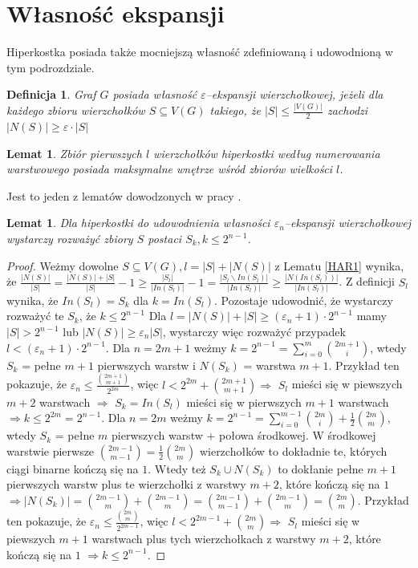 \documentclass{pracamgr}
\newtheorem{defi}{Definicja}[section] %
\newtheorem{lemma}[theorem]{Lemat}
\begin{document}
  \section{Własność ekspansji}
   Hiperkostka posiada także mocniejszą własność zdefiniowaną i udowodnioną w tym podrozdziale.
   \begin{defi}\label{epsilon ekspansja wierzcholkowa}
    Graf $G$ posiada własność \emph{$\varepsilon$--ekspansji wierzchołkowej}, jeżeli dla każdego zbioru wierzchołków $S\subseteq V(G)$ takiego,
    że $|S|\le\frac{|V(G)|}{2}$ zachodzi $|N(S)|\ge\varepsilon\cdot|S|$
   \end{defi}
   \begin{lemma}
    Zbiór pierwszych $l$ wierzchołków hiperkostki według numerowania warstwowego posiada maksymalne wnętrze wśród zbiorów wielkości $l$.  
   \end{lemma}\label{HAR1}
   Jest to jeden z lematów dowodzonych w pracy \cite{HAR}.
   \begin{lemma}\label{S->S_k}%
    Dla hiperkostki do udowodnienia własności $\varepsilon_n$--ekspansji wierzchołkowej wystarczy rozważyć zbiory $S$ postaci $S_k,k\le 2^{n-1}$.
   \end{lemma}
   \begin{proof}
    Weżmy dowolne $S\subseteq V(G), l=|S|+|N(S)|$ z Lematu \ref{HAR1} wynika, że
    $\frac{|N(S)|}{|S|}=\frac{|N(S)|+|S|}{|S|}-1\ge\frac{|S_l|}{|In(S_l)|}-1=\frac{|S_l\backslash In(S_l)|}{|In(S_l)|}\ge\frac{|N(In(S_l))|}{|In(S_l)|}$.
    Z definicji $S_l$ wynika, że $In(S_l)=S_k$ dla $k=In(S_l)$.\newline
    Pozostaje udowodnić, że wystarczy rozważyć te $S_k$, że $k\le2^{n-1}$\newline
    Dla $l=|N(S)|+|S|\ge(\varepsilon_n+1)\cdot 2^{n-1}$ mamy $|S|>2^{n-1}$ lub $|N(S)|\ge\varepsilon_n|S|$, wystarczy więc rozważyć przypadek
    $l<(\varepsilon_n+1)\cdot 2^{n-1}$.\newline
    Dla $n=2m+1$ weżmy $k=2^{n-1}=\sum_{i=0}^{m}{2m+1 \choose i}$, wtedy $S_k$ = pełne $m+1$ pierwszych warstw i $N(S_k)$ = warstwa $m+1$.
    Przykład ten pokazuje, że $\varepsilon_n\le\frac{{2m+1 \choose m+1}}{2^{2m}}$,
    więc $l<2^{2m}+{2m+1 \choose m+1}\Rightarrow$ $S_l$ mieści się w piewszych $m+2$ warstwach
    $\Rightarrow$ $S_k=In(S_l)$ mieści się w pierwszych $m+1$ warstwach $\Rightarrow k\le 2^{2m}=2^{n-1}$.\newline
    Dla $n=2m$ weżmy $k=2^{n-1}=\sum_{i=0}^{m-1}{2m \choose i}+\frac{1}{2}{2m\choose m}$, wtedy $S_k$ = pełne $m$ pierwszych warstw + połowa środkowej.
    W środkowej warstwie pierwsze ${2m-1\choose m-1}=\frac{1}{2}{2m \choose m}$ wierzchołków to dokładnie te, których ciągi binarne kończą się na $1$.
    Wtedy też $S_k\cup N(S_k)$ to dokłanie pełne $m+1$ pierwszych warstw plus te wierzchołki z warstwy $m+2$, które kończą się na $1$
    $\Rightarrow |N(S_k)|={2m-1\choose m}+{2m-1\choose m}={2m-1\choose m-1}+{2m-1 \choose m}={2m\choose m}$.
    Przykład ten pokazuje, że $\varepsilon_n\le\frac{{2m \choose m}}{2^{2m-1}}$,
    więc $l<2^{2m-1}+{2m \choose m}\Rightarrow$ $S_l$ mieści się w piewszych $m+1$ warstwach plus tych wierzchołkach z warstwy $m+2$, które kończą się na $1$
    $\Rightarrow k\le2^{n-1}$.
   \end{proof}
\end{document}

